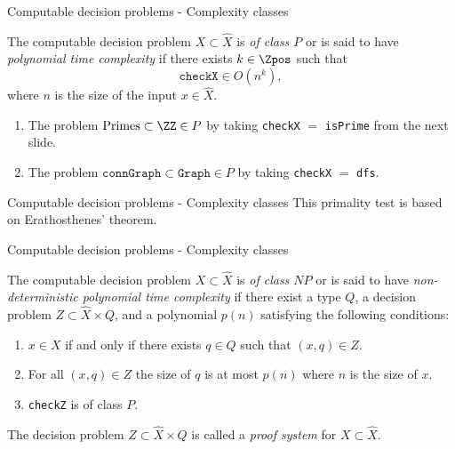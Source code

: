\begin{frame}{Computable decision problems - Complexity classes}
	\begin{defn}
		The computable decision problem $X \subset \hat{X}$ is
		\emph{of class $P$} or is said to have \emph{polynomial time complexity}
		if there exists $k \in \Zpos$ such that
		\[
			\mathtt{checkX} \in O(n^k),
		\]
		where $n$ is the size of the input $x \in \hat{X}$.
	\end{defn}

	\pause
	\begin{exl}
		\begin{enumerate}
			\item The problem
				\(
					\text{Primes} \subset \ZZ \in P
				\)
				by taking \texttt{checkX} $=$ \texttt{isPrime} from the
				next slide.
			\item The problem 
				\(
					\mathtt{connGraph} \subset \mathtt{Graph} \in P
				\)
				by taking \texttt{checkX} $=$ \texttt{dfs}.
		\end{enumerate}
	\end{exl}
\end{frame}

%

\begin{frame}{Computable decision problems - Complexity classes}
	This primality test is based on Erathosthenes' theorem.

	\bigskip
	
\end{frame}

%

\begin{frame}{Computable decision problems - Complexity classes}
	\begin{defn}
		The computable decision problem $X \subset \hat{X}$ is
		\emph{of class $NP$} or is said to have
		\emph{non-deterministic polynomial time complexity} if there exist
		a type $Q$, a decision problem $Z \subset \hat{X} \times Q$, and a
		polynomial $p(n)$ satisfying the following conditions:
		\begin{enumerate}
			\item $x \in X$ if and only if there exists $q \in Q$ such that
				$(x, q) \in Z$.
			\item For all $(x, q) \in Z$ the size of $q$ is at most $p(n)$
				where $n$ is the size of $x$.
			\item \texttt{checkZ} is of class $P$.
		\end{enumerate}

		The decision problem $Z \subset \hat{X} \times Q$ is called a
		\emph{proof system} for $X \subset \hat{X}$.
	\end{defn}
\end{frame}

